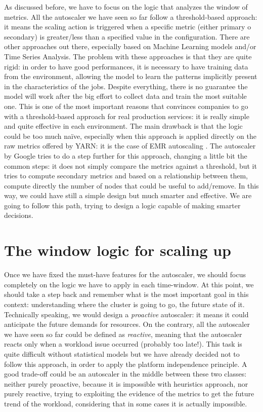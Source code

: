 \documentclass[12pt,twoside,cucitura]{toptesi}
\begin{document}
As discussed before, we have to focus on the logic that analyzes the window of metrics. All the autoscaler we have seen so far follow a threshold-based approach: it means the scaling action is triggered when a specific metric (either primary o secondary) is greater/less than a specified value in the configuration. There are other approaches out there, especially based on Machine Learning models and/or Time Series Analysis. The problem with these approaches is that they are quite rigid: in order to have good performances, it is necessary to have training data from the environment, allowing the model to learn the patterns implicitly present in the characteristics of the jobs. Despite everything, there is no guarantee the model will work after the big effort to collect data and train the most suitable one. This is one of the most important reasons that convinces companies to go with a threshold-based approach for real production services: it is really simple and quite effective in each environment. The main drawback is that the logic could be too much na{\"i}ve, especially when this approach is applied directly on the raw metrics offered by YARN: it is the case of EMR autoscaling \cite{emr_autoscaling}. The autoscaler by Google tries to do a step further for this approach, changing a little bit the common steps: it does not simply compare the metrics against a threshold, but it tries to compute secondary metrics and based on a relationship between them, compute directly the number of nodes that could be useful to add/remove. In this way, we could have still a simple design but much smarter and effective. We are going to follow this path, trying to design a logic capable of making smarter decisions.

\section{The window logic for scaling up}
Once we have fixed the must-have features for the autoscaler, we should focus completely on the logic we have to apply in each time-window. At this point, we should take a step back and remember what is the most important goal in this context: understanding where the cluster is going to go, the future state of it. Technically speaking, we would design a \textit{proactive} autoscaler: it means it could anticipate the future demands for resources. On the contrary, all the autoscaler we have seen so far could be defined as \textit{reactive}, meaning that the autoscaler reacts only when a workload issue occurred (probably too late!). This task is quite difficult without statistical models but we have already decided not to follow this approach, in order to apply the platform independence principle. A good trade-off could be an autoscaler in the middle between these two classes: neither purely proactive, because it is impossible with heuristics approach, nor purely reactive, trying to exploiting the evidence of the metrics to get the future trend of the workload, considering that in some cases it is actually impossible.
\end{document}
